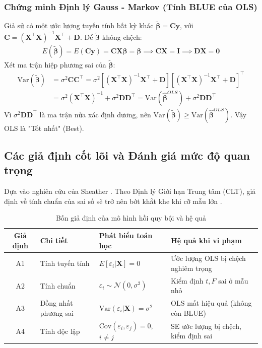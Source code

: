 \documentclass[12pt, a4paper]{article}
\begin{document}
	\subsubsection{Chứng minh Định lý Gauss - Markov (Tính BLUE của OLS)}
	Giả sử có một ước lượng tuyến tính bất kỳ khác $\tilde{\boldsymbol{\beta}} = \mathbf{C}\mathbf{y}$, với $\mathbf{C} = (\mathbf{X}^{\top}\mathbf{X})^{-1}\mathbf{X}^{\top} + \mathbf{D}$. 
	Để $\tilde{\boldsymbol{\beta}}$ không chệch:
	\begin{align}
		E(\tilde{\boldsymbol{\beta}}) = E(\mathbf{C}\mathbf{y}) = \mathbf{C}\mathbf{X}\boldsymbol{\beta} = \boldsymbol{\beta} \implies \mathbf{C}\mathbf{X} = \mathbf{I} \implies \mathbf{D}\mathbf{X} = \mathbf{0}
	\end{align}
	Xét ma trận hiệp phương sai của $\tilde{\boldsymbol{\beta}}$:
	\begin{align}
		\text{Var}(\tilde{\boldsymbol{\beta}}) &= \sigma^2 \mathbf{C}\mathbf{C}^{\top} = \sigma^2 \left[(\mathbf{X}^{\top}\mathbf{X})^{-1}\mathbf{X}^{\top} + \mathbf{D}\right] \left[(\mathbf{X}^{\top}\mathbf{X})^{-1}\mathbf{X}^{\top} + \mathbf{D}\right]^{\top} \nonumber\\
		&= \sigma^2(\mathbf{X}^{\top}\mathbf{X})^{-1} + \sigma^2\mathbf{D}\mathbf{D}^{\top} = \text{Var}(\hat{\boldsymbol{\beta}}^{OLS}) + \sigma^2\mathbf{D}\mathbf{D}^{\top}
	\end{align}
	Vì $\sigma^2\mathbf{D}\mathbf{D}^{\top}$ là ma trận nửa xác định dương, nên $\text{Var}(\tilde{\boldsymbol{\beta}}) \geq \text{Var}(\hat{\boldsymbol{\beta}}^{OLS})$. Vậy OLS là "Tốt nhất" (Best).
	
	\subsection{Các giả định cốt lõi và Đánh giá mức độ quan trọng}
	Dựa vào nghiên cứu của Sheather \cite{sheather2009}. Theo Định lý Giới hạn Trung tâm (CLT), giả định về tính chuẩn của sai số sẽ trở nên bớt khắt khe khi cỡ mẫu lớn \cite{wooldridge2015}.
	\begin{table}[H]
		\centering
		\caption{Bốn giả định của mô hình hồi quy bội và hệ quả}
		\renewcommand{\arraystretch}{1.4}
		\begin{tabular}{clp{5.5cm}p{4.5cm}}
			\toprule
			\textbf{Giả định} & \textbf{Chi tiết} & \textbf{Phát biểu toán học} & \textbf{Hệ quả khi vi phạm} \\
			\midrule
			A1 & Tính tuyến tính & $E[\varepsilon_i | \mathbf{X}] = 0$ & Ước lượng OLS bị chệch nghiêm trọng \\
			A2 & Tính chuẩn & $\varepsilon_i \sim \mathcal{N}(0, \sigma^2)$ & Kiểm định $t, F$ sai ở mẫu nhỏ \\
			A3 & Đồng nhất phương sai & $\text{Var}(\varepsilon_i | \mathbf{X}) = \sigma^2$ & OLS mất hiệu quả (không còn BLUE) \\
			A4 & Tính độc lập & $\text{Cov}(\varepsilon_i, \varepsilon_j) = 0$, $i \neq j$ & SE ước lượng bị chệch, kiểm định sai \\
			\bottomrule
		\end{tabular}
	\end{table}
	
\end{document}

